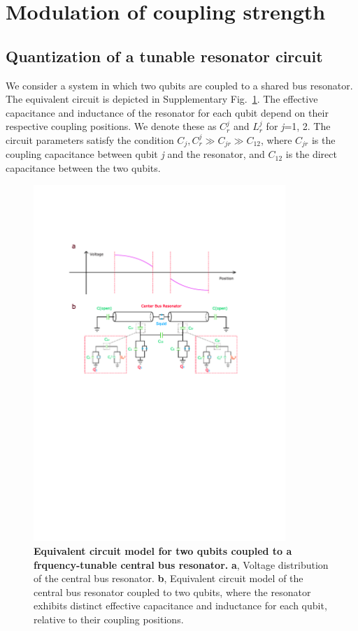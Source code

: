 \documentclass[reprint,superscriptaddress,preprintnumbers,longbibliography,
amsmath,amssymb,aps,floatfix,pra,twocolumn, tightenlines %
]{revtex4-2}
\begin{document}
    \clearpage
    \newpage


	\section{Modulation of coupling strength}
	
	\subsection{Quantization of a tunable resonator circuit}

We consider a system in which two qubits are coupled to a shared bus resonator. The equivalent circuit is depicted in Supplementary Fig.~\ref{equivalent circuit}. The effective capacitance and inductance of the resonator for each qubit depend on their respective coupling positions. We denote these as $C_r^j$ and $L_r^j$ for \textit{j}=1, 2. The circuit parameters satisfy the condition $C_{j},C_r^j\gg C_{jr}\gg C_{12}$, where $C_{jr}$ is the coupling capacitance between qubit \textit{j} and the resonator, and $C_{12}$ is the direct capacitance between the two qubits.

\begin{figure}[h]
    \centering
    \includegraphics[width=0.85\textwidth]{suppFig/equivalent_circuit.pdf}
    \caption{\textbf{Equivalent circuit model for two qubits coupled to a frquency-tunable central bus resonator.} \textbf{a}, Voltage distribution of the central bus resonator. \textbf{b}, Equivalent circuit model of the central bus resonator coupled to two qubits, where the resonator exhibits distinct effective capacitance and inductance for each qubit, relative to their coupling positions.}
    \label{equivalent circuit}
\end{figure}
\end{document}
